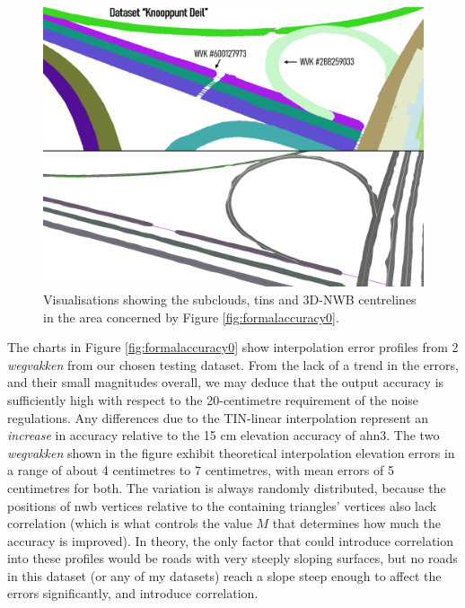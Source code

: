 \begin{figure}
    \centering
    \includegraphics[width=0.9\linewidth]{final_report/figs/formalaccuracy1.png}
    \caption{Visualisations showing the subclouds, \ac{tin}s and 3D-NWB centrelines in the area concerned by Figure \ref{fig:formalaccuracy0}.}
    \label{fig:formalaccuracy1}
\end{figure}

The charts in Figure \ref{fig:formalaccuracy0} show interpolation error profiles from 2 \textit{wegvakken} from our chosen testing dataset. From the lack of a trend in the errors, and their small magnitudes overall, we may deduce that the output accuracy is sufficiently high with respect to the 20-centimetre requirement of the noise regulations. Any differences due to the TIN-linear interpolation represent an \textit{increase} in accuracy relative to the 15 cm elevation accuracy of \ac{ahn3}. The two \textit{wegvakken} shown in the figure exhibit theoretical interpolation elevation errors in a range of about 4 centimetres to 7 centimetres, with mean errors of 5 centimetres for both. The variation is always randomly distributed, because the positions of \ac{nwb} vertices relative to the containing triangles' vertices also lack correlation (which is what controls the value $M$ that determines how much the accuracy is improved). In theory, the only factor that could introduce correlation into these profiles would be roads with very steeply sloping surfaces, but no roads in this dataset (or any of my datasets) reach a slope steep enough to affect the errors significantly, and introduce correlation.

